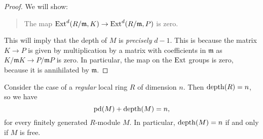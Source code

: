 \begin{proof}
We will show:
\begin{quote}
The map $\operatorname{Ext}^d(R/\mathfrak{m}, K) \to \operatorname{Ext}^{d}(R/\mathfrak{m},
P)$ is zero.
\end{quote}
This will imply that the depth of $M$ is \emph{precisely} $d-1$.
This is because the matrix $K \to P$ is given by multiplication
by a matrix
with coefficients in $\mathfrak{m}$ as $K/\mathfrak{m}K \to
P/\mathfrak{m}P$
is zero. In particular, the map on the $\operatorname{Ext}$ groups is zero,
because it is
annihilated by $\mathfrak{m}$.
\end{proof}

\begin{example} 
Consider the case of a \emph{regular} local ring $R$ of dimension $n$. Then
$\operatorname{depth}(R) = n$, so we have
\[ \mathrm{pd}(M) + \operatorname{depth}(M) = n,  \]
for every finitely generated $R$-module $M$.
In particular, $\operatorname{depth}(M) = n$ if and only if $M$ is free.
\end{example} 


